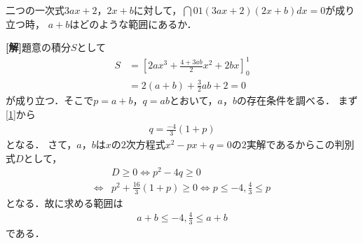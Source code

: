 \documentclass[a4j]{jarticle}
\begin{document}

     \begin{oframed}
     二つの一次式$3ax+2$，$2x+b$に対して，$\dint{0}{1}(3ax+2)(2x+b)dx=0$が成り立つ時，
     $a+b$はどのような範囲にあるか．
     \end{oframed}

\setlength{\columnseprule}{0.4pt}
\begin{multicols}{2}
{\bf[解]}題意の積分$S$として
     \begin{align}
     S&=\left[2ax^3+\frac{4+3ab}{2}x^2+2bx\right]_0^1 \nonumber\\
     &=2(a+b)+\frac{3}{2}ab+2=0\label{1}
     \end{align}
が成り立つ．そこで$p=a+b$，$q=ab$とおいて，$a$，$b$の存在条件を調べる．
まず\eqref{1}から
     \begin{align}
     q=\frac{-4}{3}(1+p)\label{2}
     \end{align}
となる．
さて，$a$，$b$は$x$の$2$次方程式$x^2-px+q=0$の$2$実解であるからこの判別式$D$として，
     \begin{align*}
     &D\ge 0 \Longleftrightarrow p^2-4q\ge0 \\
     \Longleftrightarrow
     &p^2+\frac{16}{3}(1+p)\ge0 \Longleftrightarrow p\le -4,\frac{4}{3}\le p
     \end{align*}
となる．故に求める範囲は
     \begin{align*}
     a+b\le -4,\frac{4}{3}\le a+b\tag{答}
     \end{align*}
     である．     
\newpage
\end{multicols}
\end{document}

